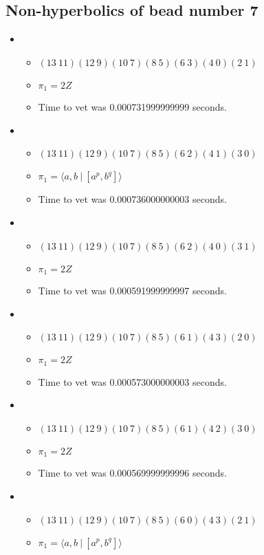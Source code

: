\documentclass{article}
\begin{document}
\subsection{Non-hyperbolics of bead number 7}
\begin{itemize}
\item \begin{itemize}
      \item $(13\ 11)(12\ 9)(10\ 7)(8\ 5)(6\ 3)(4\ 0)(2\ 1)$
      \item $\pi_1 =2 Z$
      \item Time to vet was 0.000731999999999 seconds.
\end{itemize}
\item \begin{itemize}
      \item $(13\ 11)(12\ 9)(10\ 7)(8\ 5)(6\ 2)(4\ 1)(3\ 0)$
      \item $\pi_1 = \langle a,b\ |\ [a^p,b^q]\rangle$
      \item Time to vet was 0.000736000000003 seconds.
\end{itemize}
\item \begin{itemize}
      \item $(13\ 11)(12\ 9)(10\ 7)(8\ 5)(6\ 2)(4\ 0)(3\ 1)$
      \item $\pi_1 =2 Z$
      \item Time to vet was 0.000591999999997 seconds.
\end{itemize}
\item \begin{itemize}
      \item $(13\ 11)(12\ 9)(10\ 7)(8\ 5)(6\ 1)(4\ 3)(2\ 0)$
      \item $\pi_1 =2 Z$
      \item Time to vet was 0.000573000000003 seconds.
\end{itemize}
\item \begin{itemize}
      \item $(13\ 11)(12\ 9)(10\ 7)(8\ 5)(6\ 1)(4\ 2)(3\ 0)$
      \item $\pi_1 =2 Z$
      \item Time to vet was 0.000569999999996 seconds.
\end{itemize}
\item \begin{itemize}
      \item $(13\ 11)(12\ 9)(10\ 7)(8\ 5)(6\ 0)(4\ 3)(2\ 1)$
      \item $\pi_1 = \langle a,b\ |\ [a^p,b^q]\rangle$

\end{itemize}
\end{itemize}
\end{document}
